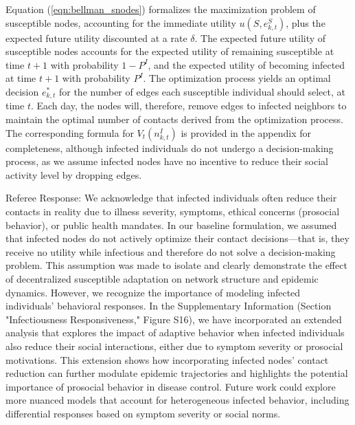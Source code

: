 \documentclass[9pt,twocolumn,twoside]{pnas-new}
\newcommand{\green}[1]{{\textcolor{green!50!black}{#1}}}
\begin{document}
Equation (\ref{eqn:bellman_snodes}) formalizes the maximization problem of susceptible nodes, accounting for the immediate utility $u(S,e_{k,t}^S)$, plus the expected future utility discounted at a rate $\delta$. The expected future utility of susceptible nodes accounts for the expected utility of remaining susceptible at time $t+1$ with probability $1-P^I$, and the expected utility of becoming infected at time $t+1$ with probability $P^I$. The optimization process yields an optimal decision $e_{k,t}^*$ for the number of edges each susceptible individual should select, at time $t$. Each day, the nodes will, therefore, remove edges to infected neighbors to maintain the optimal number of contacts derived from the optimization process. The corresponding formula for $V_{t}(n_{k,t}^I)$ is provided in the appendix for completeness, although infected individuals do not undergo a decision-making process, as we assume infected nodes have no incentive to reduce their social activity level by dropping edges.

\green{Referee Response: We acknowledge that infected individuals often reduce their contacts in reality due to illness severity, symptoms, ethical concerns (prosocial behavior), or public health mandates. In our baseline formulation, we assumed that infected nodes do not actively optimize their contact decisions—that is, they receive no utility while infectious and therefore do not solve a decision-making problem. This assumption was made to isolate and clearly demonstrate the effect of decentralized susceptible adaptation on network structure and epidemic dynamics. However, we recognize the importance of modeling infected individuals' behavioral responses. In the Supplementary Information (Section "Infectiousness Responsiveness," Figure S16), we have incorporated an extended analysis that explores the impact of adaptive behavior when infected individuals also reduce their social interactions, either due to symptom severity or prosocial motivations. This extension shows how incorporating infected nodes' contact reduction can further modulate epidemic trajectories and highlights the potential importance of prosocial behavior in disease control. Future work could explore more nuanced models that account for heterogeneous infected behavior, including differential responses based on symptom severity or social norms.}

\end{document}
